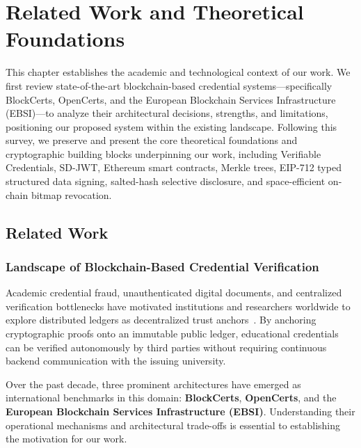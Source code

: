 
\chapter{Related Work and Theoretical Foundations}

This chapter establishes the academic and technological context of our work. We first review state-of-the-art blockchain-based credential systems—specifically BlockCerts, OpenCerts, and the European Blockchain Services Infrastructure (EBSI)—to analyze their architectural decisions, strengths, and limitations, positioning our proposed system within the existing landscape. Following this survey, we preserve and present the core theoretical foundations and cryptographic building blocks underpinning our work, including Verifiable Credentials, SD-JWT, Ethereum smart contracts, Merkle trees, EIP-712 typed structured data signing, salted-hash selective disclosure, and space-efficient on-chain bitmap revocation.

\section{Related Work}

\subsection{Landscape of Blockchain-Based Credential Verification}

Academic credential fraud, unauthenticated digital documents, and centralized verification bottlenecks have motivated institutions and researchers worldwide to explore distributed ledgers as decentralized trust anchors~\cite{Grech2017BlockchainInEducation,Sharples2016Kudos,Chen2018BlockchainEducation,Ocheja2019LifelongLearning}. By anchoring cryptographic proofs onto an immutable public ledger, educational credentials can be verified autonomously by third parties without requiring continuous backend communication with the issuing university. 

Over the past decade, three prominent architectures have emerged as international benchmarks in this domain: \textbf{BlockCerts}, \textbf{OpenCerts}, and the \textbf{European Blockchain Services Infrastructure (EBSI)}. Understanding their operational mechanisms and architectural trade-offs is essential to establishing the motivation for our work.

